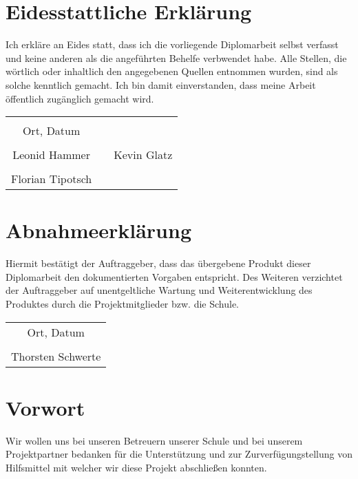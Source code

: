 \chapter*{Eidesstattliche Erklärung}
Ich erkläre an Eides statt, dass ich die vorliegende Diplomarbeit selbst verfasst und keine anderen als die angeführten Behelfe verbwendet habe. Alle Stellen, die wörtlich oder inhaltlich den angegebenen Quellen entnommen wurden, sind als solche kenntlich gemacht.
Ich bin damit einverstanden, dass meine Arbeit öffentlich zugänglich gemacht wird.

\vspace{1cm}
\begin{tabular}{c c c}
	& \hspace{4cm} & \\\cline{1-1}
	Ort, Datum & & \\
	\vspace{2cm}
	& & \\\cline{1-1}\cline{3-3}
	Leonid Hammer & & Kevin Glatz \\ 
	\vspace{2cm}
	& & \\\cline{1-1}
	 Florian Tipotsch
\end{tabular}

\chapter*{Abnahmeerklärung}
Hiermit bestätigt der Auftraggeber, dass das übergebene Produkt dieser Diplomarbeit den dokumentierten Vorgaben entspricht. Des Weiteren verzichtet der Auftraggeber auf unentgeltliche Wartung und Weiterentwicklung des Produktes durch die Projektmitglieder bzw. die Schule.

\vspace{1cm}
\begin{tabular}{c}
	\\\cline{1-1}
	Ort, Datum\\
	\vspace{2cm}
	\\\cline{1-1}
	Thorsten Schwerte
\end{tabular}	

\chapter*{Vorwort}
Wir wollen uns bei unseren Betreuern unserer Schule und bei unserem Projektpartner bedanken für die Unterstützung und zur Zurverfügungstellung von Hilfsmittel mit welcher wir diese Projekt abschließen konnten.


